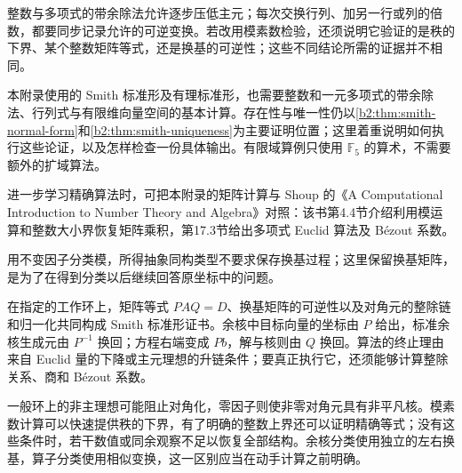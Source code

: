 \ProseParagraphBreak

整数与多项式的带余除法允许逐步压低主元；每次交换行列、加另一行或列的倍数，都要同步记录允许的可逆变换。若改用模素数检验，还须说明它验证的是秩的下界、某个整数矩阵等式，还是换基的可逆性；这些不同结论所需的证据并不相同。

\ProseParagraphBreak

本附录使用的 Smith 标准形及有理标准形，也需要整数和一元多项式的带余除法、行列式与有限维向量空间的基本计算。存在性与唯一性仍以\cref{b2:thm:smith-normal-form}和\cref{b2:thm:smith-uniqueness}为主要证明位置；这里着重说明如何执行这些论证，以及怎样检查一份具体输出。有限域算例只使用 \(\mathbb F_5\) 的算术，不需要额外的扩域算法。

\ProseParagraphBreak
进一步学习精确算法时，可把本附录的矩阵计算与 Shoup 的《A Computational Introduction to Number Theory and Algebra》\cite[Sections 4.4, 17.3]{Shoup2008NumberTheoryAlgebra}对照：该书第4.4节介绍利用模运算和整数大小界恢复矩阵乘积，第17.3节给出多项式 Euclid 算法及 Bézout 系数。


\ProseParagraphBreak
{}用不变因子分类模，所得抽象同构类型不要求保存换基过程；这里保留换基矩阵，是为了在得到分类以后继续回答原坐标中的问题。






\begin{chaptersummary}
	在指定的工作环上，矩阵等式 \(PAQ=D\)、换基矩阵的可逆性以及对角元的整除链和归一化共同构成 Smith 标准形证书。余核中目标向量的坐标由 \(P\) 给出，标准余核生成元由 \(P^{-1}\) 换回；方程右端变成 \(Pb\)，解与核则由 \(Q\) 换回。算法的终止理由来自 Euclid 量的下降或主元理想的升链条件；要真正执行它，还须能够计算整除关系、商和 Bézout 系数。

	\ProseParagraphBreak
	一般环上的非主理想可能阻止对角化，零因子则使非零对角元具有非平凡核。模素数计算可以快速提供秩的下界，有了明确的整数上界还可以证明精确等式；没有这些条件时，若干数值或同余观察不足以恢复全部结构。余核分类使用独立的左右换基，算子分类使用相似变换，这一区别应当在动手计算之前明确。
\end{chaptersummary}

\BookExercises

